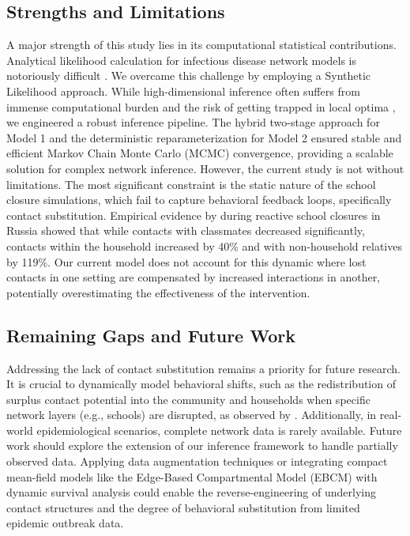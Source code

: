 \subsection{Strengths and Limitations}
A major strength of this study lies in its computational statistical contributions.
Analytical likelihood calculation for infectious disease network models is notoriously difficult \parencite{mckinley2009inference}.
We overcame this challenge by employing a Synthetic Likelihood approach.
While high-dimensional inference often suffers from immense computational burden and the risk of getting trapped in local optima \parencite{ong2018likelihoodfree, picchini2023sequentially}, we engineered a robust inference pipeline.
The hybrid two-stage approach for Model 1 and the deterministic reparameterization for Model 2 ensured stable and efficient Markov Chain Monte Carlo (MCMC) convergence, providing a scalable solution for complex network inference.
However, the current study is not without limitations.
The most significant constraint is the static nature of the school closure simulations, which fail to capture behavioral feedback loops, specifically contact substitution.
Empirical evidence by \textcite{litvinova2019reactive} during reactive school closures in Russia showed that while contacts with classmates decreased significantly, contacts within the household increased by 40\% and with non-household relatives by 119\%.
Our current model does not account for this dynamic where lost contacts in one setting are compensated by increased interactions in another, potentially overestimating the effectiveness of the intervention.

\subsection{Remaining Gaps and Future Work}
Addressing the lack of contact substitution remains a priority for future research.
It is crucial to dynamically model behavioral shifts, such as the redistribution of surplus contact potential into the community and households when specific network layers (e.g., schools) are disrupted, as observed by \textcite{litvinova2019reactive}.
Additionally, in real-world epidemiological scenarios, complete network data is rarely available.
Future work should explore the extension of our inference framework to handle partially observed data.
Applying data augmentation techniques \parencite{bu2022likelihoodbased} or integrating compact mean-field models like the Edge-Based Compartmental Model (EBCM) with dynamic survival analysis \parencite{guzman2025inferring} could enable the reverse-engineering of underlying contact structures and the degree of behavioral substitution from limited epidemic outbreak data.

